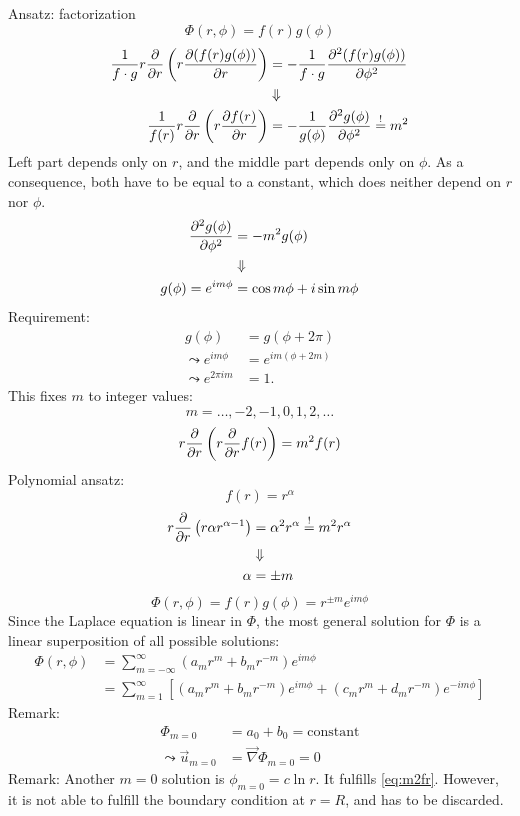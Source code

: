Ansatz: factorization
\begin{equation}
\Phi(r,\phi) = f(r)g(\phi)
\end{equation}
\begin{align}
\frac{1}{f\cdot g} r\frac{\partial }{\partial r}\left(r\frac{\partial (f(r)g(\phi))}{\partial r}\right) &= -\frac{1}{f\cdot g}\frac{\partial^2 (f(r)g(\phi))}{\partial \phi^2} \\
&\Downarrow\notag\\
\frac{1}{f(r)}r\frac{\partial }{\partial r}\left(r\frac{\partial f(r)}{\partial r}\right) &= -\frac{1}{g(\phi)}\frac{\partial^2 g(\phi)}{\partial \phi^2} \overset{!}{=} m^2
\end{align}
Left part depends only on $r$, and the middle part depends only on $\phi$. As a consequence, both have to be equal to a constant, which does neither depend on $r$ nor $\phi$.
\begin{align}
\frac{\partial^2 g(\phi)}{\partial \phi^2} &= -m^2g(\phi)\\
&\Downarrow\notag\\
g(\phi) = e^{im\phi} &=  \cos m\phi + i\sin m\phi
\end{align}
Requirement:
\begin{align}
g(\phi) &= g(\phi+2\pi)\\
\leadsto
e^{im\phi} &= e^{im(\phi+2m)}\\
\leadsto
e^{2\pi im} &= 1.
\end{align}
This fixes $m$ to integer values:
\begin{equation}
m = \dots,-2,-1,0,1,2,\dots
\end{equation}
\begin{equation}\label{eq:m2fr}
r\frac{\partial }{\partial r}\left(r\frac{\partial }{\partial r}f(r)\right) = m^2f(r)
\end{equation}
Polynomial ansatz:
\begin{equation}
f(r) = r^\alpha
\end{equation}
\begin{align}
r\frac{\partial }{\partial r}\left(r\alpha r^{\alpha-1}\right) &= \alpha^2 r^\alpha \overset{!}{=} m^2 r^\alpha\\
&\Downarrow\notag\\
\alpha &= \pm m
\end{align}
\begin{equation}
\Phi(r,\phi) = f(r)g(\phi) = r^{\pm m}e^{im\phi}
\end{equation}
Since the Laplace equation is linear in $\Phi$, the most general solution for $\Phi$ is a linear superposition of all possible solutions:
\begin{align}
\Phi(r,\phi) &= \sum_{m=-\infty}^\infty \left(a_m r^m + b_m r^{-m}\right) e^{im\phi} \\
&= \sum_{m=1}^{\infty} \left[ \left(a_m r^m + b_m r^{-m}\right)e^{im\phi} + \left(c_m r^m + d_m r^{-m}\right) e^{-im\phi}\right]
\end{align}
Remark:
\begin{align}
\Phi_{m=0} &= a_0+b_0 = \mathrm{constant} \\
\leadsto
\vec{u}_{m=0} &= \vec{\nabla}\Phi_{m=0}=0
\end{align}
Remark: Another $m=0$ solution is $\phi_{m=0}=c\ln r$. It fulfills \eqref{eq:m2fr}. However, it is not able to fulfill the boundary condition at $r=R$, and has to be discarded.

